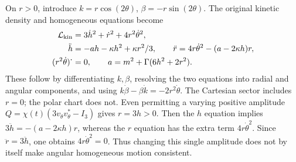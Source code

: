 On \(r>0\), introduce \(k=r\cos(2\theta)\),
\(\beta=-r\sin(2\theta)\). The original kinetic density and homogeneous
equations become
\begin{align}
 \mathcal L_{\rm kin}
   &=3\dot h^2+\dot r^2+4r^2\dot\theta^2,\notag\\
 \ddot h&=-ah-\kappa h^2+\kappa r^2/3,\qquad
 \ddot r=4r\dot\theta^2-(a-2\kappa h)r,\label{q444:vk-polar}\\
 (r^2\dot\theta)^{\boldsymbol\cdot}&=0,\qquad
 a=m^2+\Gamma(6h^2+2r^2).\notag
\end{align}
These follow by differentiating \(k,\beta\), resolving the two
equations into radial and angular components, and using
\(k\dot\beta-\beta\dot k=-2r^2\dot\theta\).
The Cartesian sector includes \(r=0\); the polar chart does not.
Even permitting a varying positive amplitude
\(Q=\chi(t)(3v_\theta v_\theta^*-I_3)\) gives \(r=3h>0\).
Then the \(h\) equation implies
 \(3\ddot h=-(a-2\kappa h)r\), whereas the \(r\) equation
has the extra term \(4r\dot\theta^2\). Since \(\ddot r=3\ddot h\),
one obtains \(4r\dot\theta^2=0\). Thus changing this single amplitude
does not by itself make angular homogeneous motion consistent.

